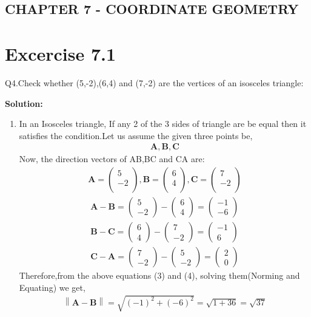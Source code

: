 \documentclass[12pt]{article}
\providecommand{\norm}[1]{\left\lVert#1\right\rVert}
\newcommand{\solution}{\noindent \textbf{Solution: }}
\newcommand{\myvec}[1]{\ensuremath{\begin{pmatrix}#1\end{pmatrix}}}
\let\vec\mathbf
\begin{document}
\begin{center}
\section*{CHAPTER 7 - COORDINATE GEOMETRY}

\end{center}
\section*{Excercise 7.1}

Q4.Check whether (5,-2),(6,4) and (7,-2) are the vertices of an isosceles triangle:

\solution
\begin{enumerate}
\item In an Isosceles triangle, If any 2 of the 3 sides of  triangle are be equal then it satisfies the condition.Let us assume the given three points be,
	\begin{align}
\vec{A} , \vec{B} , \vec{C}
	\end{align}
Now, the direction vectors of AB,BC and CA are:
	\begin{align}
	\vec{A} = \myvec{
	    5\\
	   -2\\
		},
	\vec{B} = \myvec{
	    6\\
		4\\
		},
	\vec{C} = \myvec{
		7\\
	   -2\\
	    }
	\end{align}  
	\begin{align}
		\vec{A} - \vec{B} = \myvec{5\\-2} - \myvec{6\\4} = \myvec{-1\\-6}\\
		\vec{B} - \vec{C} = \myvec{6\\4} - \myvec{7\\-2} = \myvec{-1\\6}\\
		\vec{C} - \vec{A} = \myvec{7\\-2} - \myvec{5\\-2} = \myvec{2\\0}		
	\end{align}
    Therefore,from the above equations (3) and (4), solving them(Norming and Equating) we get,
	\begin{align}
 		\norm{\vec{A}-\vec{B}} = \sqrt{(-1)^2+(-6)^2} = \sqrt{1+36} = \sqrt{37} 

\end{align}
\end{enumerate}
\end{document}
